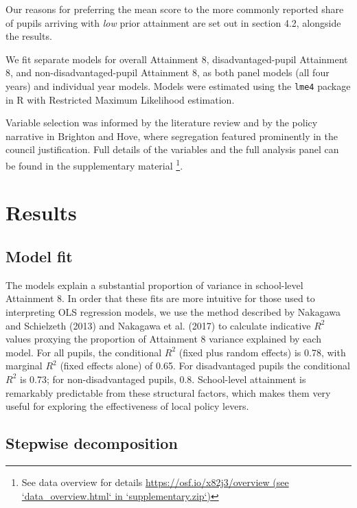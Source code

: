 \documentclass[
  12pt,
  titlepage]{article}
\begin{document}
Our reasons for preferring the mean score to the more commonly reported
share of pupils arriving with \emph{low} prior attainment are set out in
section 4.2, alongside the results.

We fit separate models for overall Attainment 8, disadvantaged-pupil
Attainment 8, and non-disadvantaged-pupil Attainment 8, as both panel
models (all four years) and individual year models. Models were
estimated using the \texttt{lme4} package in R with Restricted Maximum
Likelihood estimation.

Variable selection was informed by the literature review and by the
policy narrative in Brighton and Hove, where segregation featured
prominently in the council justification. Full details of the variables
and the full analysis panel can be found in the supplementary material
\footnote{See data overview for details
  \href{https://osf.io/x82j3/overview}{https://osf.io/x82j3/overview
  (see `data\_overview.html` in `supplementary.zip`)}}.

\section{Results}\label{results}

\subsection{Model fit}\label{model-fit}

The models explain a substantial proportion of variance in school-level
Attainment 8. In order that these fits are more intuitive for those used
to interpreting OLS regression models, we use the method described by
Nakagawa and Schielzeth (2013) and Nakagawa et al. (2017) to calculate
indicative \(R^2\) values proxying the proportion of Attainment 8
variance explained by each model. For all pupils, the conditional
\(R^2\) (fixed plus random effects) is 0.78, with marginal \(R^2\)
(fixed effects alone) of 0.65. For disadvantaged pupils the conditional
\(R^2\) is 0.73; for non-disadvantaged pupils, 0.8. School-level
attainment is remarkably predictable from these structural factors,
which makes them very useful for exploring the effectiveness of local
policy levers.

\subsection{Stepwise decomposition}\label{stepwise-decomposition}
\end{document}
